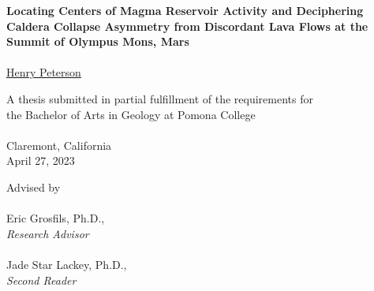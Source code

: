 \renewcommand{\headrulewidth}{0pt} %
\begin{titlepage}
    \begin{center}

        \phantom{.}
        \vfill
        \vfill
        \large\textbf{Locating Centers of Magma Reservoir Activity and Deciphering Caldera Collapse Asymmetry from Discordant Lava Flows at the Summit of Olympus Mons, Mars}
        \\~\\
        \href{mailto:hgpa2018@mymail.pomona.edu}{Henry Peterson}

        \vfill
        \vfill

        A thesis submitted in partial fulfillment of the requirements for\\
        the Bachelor of Arts in Geology at Pomona College\\~\\
        Claremont, California\\
        April 27, 2023

        \vfill
        \phantom{.}

        \newpage

        \phantom{.}
        \vfill
        Advised by
        \\~\\
        Eric Grosfils, Ph.D.,\\
        \emph{Research Advisor}
        \\~\\
        Jade Star Lackey, Ph.D.,\\
        \emph{Second Reader}
        \vfill
        \phantom{.}

    \end{center}
\end{titlepage}

\renewcommand{\headrulewidth}{0.5pt}